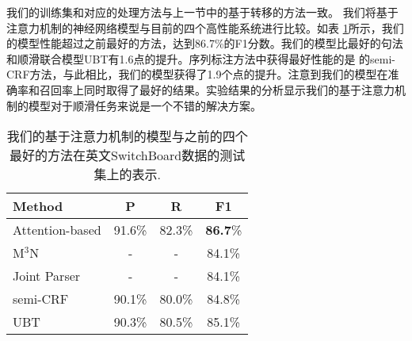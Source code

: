 我们的训练集和对应的处理方法与上一节中的基于转移的方法一致。
我们将基于注意力机制的神经网络模型与目前的四个高性能系统进行比较。如表 \ref{previous_work}所示，我们的模型性能超过之前最好的方法，达到86.7\%的F1分数。我们的模型比最好的句法和顺滑联合模型UBT有1.6点的提升。序列标注方法中获得最好性能的是 的semi-CRF方法，与此相比，我们的模型获得了1.9个点的提升。注意到我们的模型在准确率和召回率上同时取得了最好的结果。实验结果的分析显示我们的基于注意力机制的模型对于顺滑任务来说是一个不错的解决方案。
\begin{table}[htbp]
	\setlength{\tabcolsep}{5pt}
	
	\begin{center}
		\begin{tabular}{l|ccc}
			\hline
			\bf    Method & \bf P & \bf R & \bf F1 \\
			\hline
			Attention-based &  91.6\% & 82.3\% & \textbf{86.7}\%\\ 
			\hline
			M$^3$N \citeyqy{qian2013disfluency} & - & - & 84.1\%\\
			Joint Parser \citeyqy{honnibal2014joint} &  - & - & 84.1\%\\
			semi-CRF \citeyqy{ferguson-durrett-klein:2015:NAACL-HLT} & 90.1\% & 80.0\% & 84.8\%\\
			UBT \citeyqy{wu-EtAl:2015:ACL-IJCNLP} &  90.3\% & 80.5\% & 85.1\%\\            
			\hline
			
		\end{tabular}
	\end{center}
	\caption{\label{re_error} 我们的基于注意力机制的模型与之前的四个最好的方法在英文SwitchBoard数据的测试集上的表示.}
	\label{previous_work}
\end{table}

